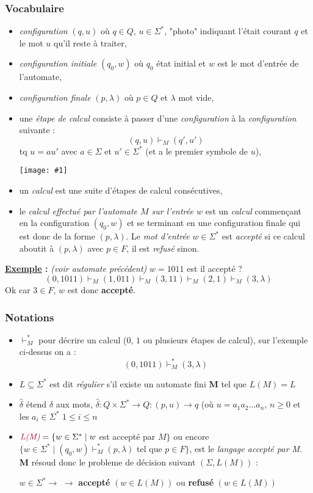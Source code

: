 \documentclass{article}
\newcommand{\titre}[1]{\textcolor{title}{#1}}
\newcommand{\tsssect}[1]{\titre{\subsubsection{#1}}}
\newcommand{\term}[1]{\textit{\textcolor{maintitle}{#1}}}
\newcommand{\imgR}[2]{\begin{center}\texttt{[image: \#1]}\end{center}}
\begin{document}
\begin{sffamily}
\tsssect{Vocabulaire}

\begin{itemize}
\item \term{configuration} $(q,u)$ où $q \in Q$, $u\in \Sigma^*$, "photo" indiquant l'était courant $q$ et le mot $u$ 
qu'il reste à traiter,
\item \term{configuration initiale} $(q_0,w)$ où $q_0$ état initial et $w$ est le mot d'entrée de l'automate,
\item \term{configuration finale} $(p,\lambda)$ où $p \in Q$ et $\lambda$ mot vide,
\item une \term{étape de calcul} consiste à passer d'une \term{configuration} à la \term{configuration} suivante :
$$ (q,u) \vdash_M (q',u') $$ tq $u=au'$ avec $a\in \Sigma$ et $u'\in \Sigma^*$ (et a le premier symbole de $u$),
\imgR{img9.png}{100}
\item un \term{calcul} est une suite d'étapes de calcul consécutives,
\item le \term{calcul effectué par l'automate $M$ sur l'entrée $w$} est un \term{calcul} commençant en la configuration 
$(q_0,w)$ et se terminant en une configuration finale qui est donc de la forme $(p,\lambda)$. Le \term{mot d'entrée} $w 
\in \Sigma^*$ est \term{accepté} si ce calcul aboutit à $(p,\lambda)$ avec $p\in F$, il est \term{refusé} sinon.\\
\end{itemize}

\noindent \textbf{\underline{Exemple} :}\textit{ (voir automate précédent)} $w = 1011$ est il accepté ?
$$ (0,1011) \vdash_M (1,011) \vdash_M (3,11) \vdash_M (2,1) \vdash_M (3,\lambda) $$
Ok car $3 \in F$, $w$ est donc \textbf{accepté}.

\tsssect{Notations}

\begin{itemize}
\item \term{$\vdash_M^*$} pour décrire un calcul ($0$, $1$ ou plusieurs étapes de calcul), sur l'exemple ci-dessus on a 
: $$ (0,1011) \vdash_M^* (3,\lambda) $$
\item $L \subseteq \Sigma^*$ est dit \term{régulier} s'il existe un automate fini \textbf{M} tel que $L(M)= L$
\item $\hat{\delta}$ étend $\delta$ aux mots, $\hat{\delta} : Q \times \Sigma^* \to Q : (p,u) \to q$ (où 
$u=a_1a_2...a_n$, $n\geq 0$ et les $a_i \in \Sigma^* $ $1 \leq i \leq n$
\item $\term{L(M)} = \{w \in \Sigma^* \mid w$ est accepté par $M \}$ ou encore $ \{w \in \Sigma^* \mid (q_0,w)
\vdash_M^* (p,\lambda)$ tel que $p \in F \}$, est le \term{langage accepté par M}.\\
\textbf{M} résoud donc le probleme de décision suivant $(\Sigma,L(M))$ :
\begin{center}$w \in \Sigma^* \to$  $\to$ \textbf{accepté} $(w\in L(M))$ ou \textbf{refusé} $(w\in 
L(M))$ \end{center}


\end{itemize}
\end{sffamily}
\end{document}
